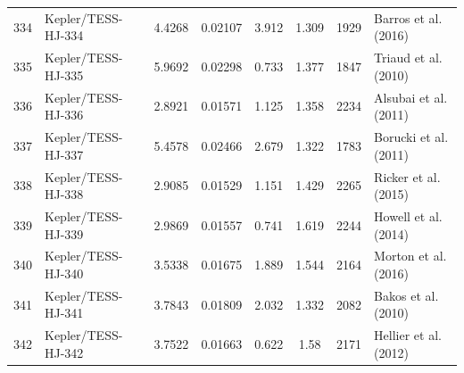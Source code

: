 \begin{longtable}{r l c c c c c p{4.2cm}}
334 & Kepler/TESS-HJ-334 & 4.4268 & 0.02107 & 3.912 & 1.309 & 1929 & Barros et al. (2016) \\
335 & Kepler/TESS-HJ-335 & 5.9692 & 0.02298 & 0.733 & 1.377 & 1847 & Triaud et al. (2010) \\
336 & Kepler/TESS-HJ-336 & 2.8921 & 0.01571 & 1.125 & 1.358 & 2234 & Alsubai et al. (2011) \\
337 & Kepler/TESS-HJ-337 & 5.4578 & 0.02466 & 2.679 & 1.322 & 1783 & Borucki et al. (2011) \\
338 & Kepler/TESS-HJ-338 & 2.9085 & 0.01529 & 1.151 & 1.429 & 2265 & Ricker et al. (2015) \\
339 & Kepler/TESS-HJ-339 & 2.9869 & 0.01557 & 0.741 & 1.619 & 2244 & Howell et al. (2014) \\
340 & Kepler/TESS-HJ-340 & 3.5338 & 0.01675 & 1.889 & 1.544 & 2164 & Morton et al. (2016) \\
341 & Kepler/TESS-HJ-341 & 3.7843 & 0.01809 & 2.032 & 1.332 & 2082 & Bakos et al. (2010) \\
342 & Kepler/TESS-HJ-342 & 3.7522 & 0.01663 & 0.622 & 1.58 & 2171 & Hellier et al. (2012) \\
\end{longtable}